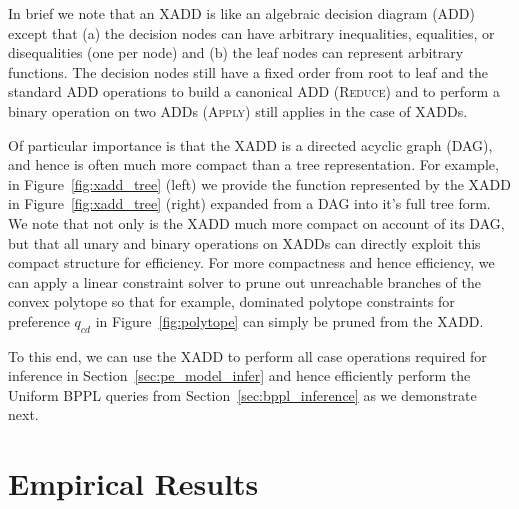 \documentclass{article} %
\begin{document}
In brief we note that an XADD is like an algebraic decision 
diagram (ADD)~\cite{bahar93add} except that (a) the decision
nodes can have arbitrary inequalities, equalities, or disequalities (one
per node) and (b) the leaf nodes can represent arbitrary functions.
The decision nodes still have a fixed order from root to leaf
and the standard ADD
operations to build a canonical ADD (\textsc{Reduce}) and 
to perform a binary operation on two ADDs (\textsc{Apply}) 
still applies in the case of XADDs. 

Of particular importance is that the XADD is a directed acyclic graph
(DAG), and hence is often much more compact than a tree
representation.  For example, in Figure~\ref{fig:xadd_tree} (left) we provide
the function represented by the XADD in Figure~\ref{fig:xadd_tree} (right) 
expanded from a DAG into it's full tree form.  We note that not only is
the XADD much more compact on account of its DAG, but that all
unary and binary operations on XADDs can directly exploit this
compact structure for efficiency.  For more compactness and hence efficiency, 
we can apply a linear
constraint solver to prune out unreachable branches of the convex
polytope so that for example, dominated polytope constraints 
for preference $q_{cd}$ in Figure~\ref{fig:polytope} can simply
be pruned from the XADD.

To this end, we can use the XADD to perform all case operations
required for inference in Section~\ref{sec:pe_model_infer} and hence
efficiently perform the Uniform BPPL queries from
Section~\ref{sec:bppl_inference} as we demonstrate next.

\section{Empirical Results}
\end{document}
